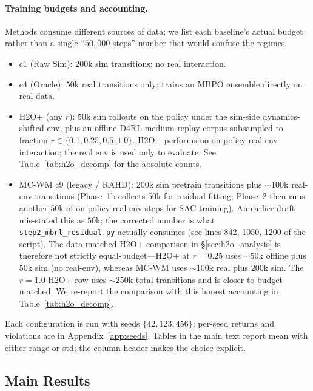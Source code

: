 \documentclass{article}
\theoremstyle{definition}
\begin{document}
\paragraph{Training budgets and accounting.}  Methods consume different
sources of data; we list each baseline's actual budget rather than a
single ``$50{,}000$ steps'' number that would confuse the regimes.
\begin{itemize}
\item c1 (Raw Sim): $200$k sim transitions; no real interaction.
\item c4 (Oracle): $50$k real transitions only; trains an MBPO ensemble
directly on real data.
\item H2O+ (any $r$): $50$k sim rollouts on the policy under the
sim-side dynamics-shifted env, plus an offline D4RL medium-replay
corpus subsampled to fraction $r\in\{0.1,0.25,0.5,1.0\}$.  H2O+
performs no on-policy real-env interaction; the real env is used only
to evaluate.  See Table~\ref{tab:h2o_decomp} for the absolute counts.
\item MC-WM c9 (legacy / RAHD): $200$k sim pretrain transitions plus
$\sim\!100$k real-env transitions (Phase~1b collects $50$k for
residual fitting; Phase~2 then runs another $50$k of on-policy
real-env steps for SAC training).  An earlier draft mis-stated this
as $50$k; the corrected number is what \texttt{step2\_mbrl\_residual.py}
actually consumes (see lines 842, 1050, 1200 of the script).  The
data-matched H2O+ comparison in §\ref{sec:h2o_analysis} is therefore
not strictly equal-budget---H2O+ at $r=0.25$ uses $\sim\!50$k offline
plus $50$k sim (no real-env), whereas MC-WM uses
$\sim\!100$k real plus $200$k sim.  The $r=1.0$ H2O+ row uses
$\sim\!250$k total transitions and is closer to budget-matched.  We
re-report the comparison with this honest accounting in
Table~\ref{tab:h2o_decomp}.
\end{itemize}
Each configuration is run with seeds $\{42, 123, 456\}$; per-seed
returns and violations are in Appendix~\ref{app:seeds}.  Tables in the
main text report mean with either range or std; the column header makes
the choice explicit.

\subsection{Main Results}
\end{document}
